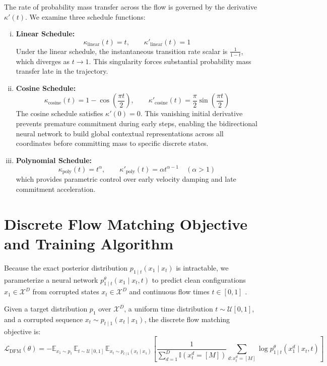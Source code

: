 The rate of probability mass transfer across the flow is governed by the derivative $\kappa'(t)$. We examine three schedule functions:
\begin{enumerate}[(i)]
\item \textbf{Linear Schedule:}
\begin{equation}
\kappa_{\text{linear}}(t) = t, \qquad \kappa'_{\text{linear}}(t) = 1
\label{eq:linear_sched}
\end{equation}
Under the linear schedule, the instantaneous transition rate scalar is $\frac{1}{1-t}$, which diverges as $t \to 1$. This singularity forces substantial probability mass transfer late in the trajectory.
\item \textbf{Cosine Schedule:}
\begin{equation}
\kappa_{\text{cosine}}(t) = 1 - \cos\left( \frac{\pi t}{2} \right), \qquad \kappa'_{\text{cosine}}(t) = \frac{\pi}{2} \sin\left( \frac{\pi t}{2} \right)
\label{eq:cosine_sched}
\end{equation}
The cosine schedule satisfies $\kappa'(0) = 0$. This vanishing initial derivative prevents premature commitment during early steps, enabling the bidirectional neural network to build global contextual representations across all coordinates before committing mass to specific discrete states.
\item \textbf{Polynomial Schedule:}
\begin{equation}
\kappa_{\text{poly}}(t) = t^\alpha, \qquad \kappa'_{\text{poly}}(t) = \alpha t^{\alpha-1} \quad (\alpha > 1)
\label{eq:poly_sched}
\end{equation}
which provides parametric control over early velocity damping and late commitment acceleration.
\end{enumerate}

\section{Discrete Flow Matching Objective and Training Algorithm}

Because the exact posterior distribution $p_{1 \mid t}(x_1 \mid x_t)$ is intractable, we parameterize a neural network $p_{1 \mid t}^\theta(x_1 \mid x_t, t)$ to predict clean configurations $x_1 \in \mathcal{X}^D$ from corrupted states $x_t \in \mathcal{X}^D$ and continuous flow times $t \in [0, 1]$ \citep{Campbell2024}.

\begin{defn}
Given a target distribution $p_1$ over $\mathcal{X}^D$, a uniform time distribution $t \sim \mathcal{U}[0, 1]$, and a corrupted sequence $x_t \sim p_{t \mid 1}(x_t \mid x_1)$, the discrete flow matching objective is:
\begin{equation}
\mathcal{L}_{\text{DFM}}(\theta) = - \mathbb{E}_{x_1 \sim p_1} \, \mathbb{E}_{t \sim \mathcal{U}[0, 1]} \, \mathbb{E}_{x_t \sim p_{t \mid 1}(x_t \mid x_1)} \left[ \frac{1}{\sum_{d=1}^D \mathbb{I}(x_t^d = [M])} \sum_{d: x_t^d = [M]} \log p_{1 \mid t}^\theta(x_1^d \mid x_t, t) \right]
\label{eq:dfm_loss}
\end{equation}
\end{defn}

